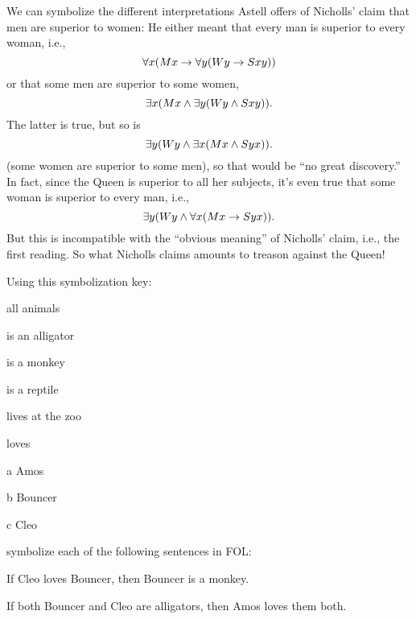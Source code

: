 We can symbolize the different interpretations Astell offers of
Nicholls' claim that men are superior to women:
He either meant that every man is superior to every woman, i.e.,
\[
\forall x(Mx \rightarrow \forall y(Wy \rightarrow Sxy))
\]
or that some men are superior to some women,
\[
\exists x(Mx \mathbin{\wedge} \exists y(Wy \mathbin{\wedge} Sxy)).
\]
The latter is true, but so is
\[
\exists y(Wy \mathbin{\wedge} \exists x(Mx \mathbin{\wedge} Syx)).
\]
(some women are superior to some men), so that would be ``no great
discovery.''  In fact, since the Queen is superior to all her
subjects, it's even true that some woman is superior to every man,
i.e.,
\[
\exists y(Wy \land \forall x(Mx \rightarrow Syx)).
\]
But this is incompatible with the ``obvious meaning'' of Nicholls'
claim, i.e., the first reading. So what Nicholls claims amounts to
treason against the Queen!

\begin{practiceproblems}
\solutions
\problempart
Using this symbolization key:
\begin{ekey}
\item[\text{domain}] all animals
\item[\atom{A}{x}]  is an alligator
\item[\atom{M}{x}]  is a monkey
\item[\atom{R}{x}]  is a reptile
\item[\atom{Z}{x}]  lives at the zoo
\item[\atom{L}{x,y}]  loves 
\item[a] Amos
\item[b] Bouncer
\item[c] Cleo
\end{ekey}
symbolize each of the following sentences in FOL:
\begin{earg}
\item If Cleo loves Bouncer, then Bouncer is a monkey.
\item[] 
\item If both Bouncer and Cleo are alligators, then Amos loves them both.
\item[] 

\end{earg}
\end{practiceproblems}
